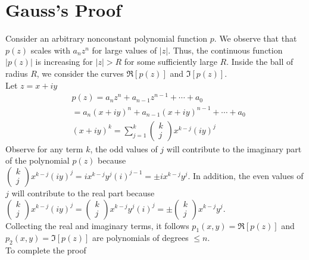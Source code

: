 \section*{Gauss's Proof}
Consider an arbitrary nonconstant polynomial function $p$. 
We observe that that $p(z)$ scales with $a_n z^n$ for large values of $\lvert z\rvert$. 
Thus, the continuous function $\lvert p(z)\rvert$ is increasing for $\lvert z\rvert>R$ for some sufficiently large $R$.
Inside the ball of radius $R$, we consider the curves $\Re[p(z)]$ and $\Im[p(z)]$.\\
Let $z=x+iy$
\begin{align*}
    &p(z)=a_n z^n+a_{n-1} z^{n-1}+\cdots+a_0\\
    &=a_n {(x+iy)}^n+a_{n-1} {(x+iy)}^{n-1}+\cdots+a_0\\
    &{(x+iy)}^k=\sum_{j=1}^{k}\begin{pmatrix}
        k\\
        j
    \end{pmatrix}x^{k-j}{(iy)}^j
\end{align*} 
Observe for any term $k$, the odd values of $j$ will contribute to the imaginary part of the polynomial $p(z)$ because $\begin{pmatrix}
    k\\
    j
\end{pmatrix}x^{k-j}{(iy)}^j=ix^{k-j}y^{j}{(i)}^{j-1}=\pm ix^{k-j}y^{j}$. In addition, the even values of $j$ will contribute to the real part because $\begin{pmatrix}
    k\\
    j
\end{pmatrix}x^{k-j}{(iy)}^j=\begin{pmatrix}
    k\\
    j
\end{pmatrix}x^{k-j}y^{j}{(i)}^{j}=\pm \begin{pmatrix}
    k\\
    j
\end{pmatrix}x^{k-j}y^{j}$.\\
Collecting the real and imaginary terms, it follows $p_1(x,y)=\Re[p(z)]$ and $p_2(x,y)=\Im[p(z)]$ are polynomials of degrees $\le n$.\\

To complete the proof 
